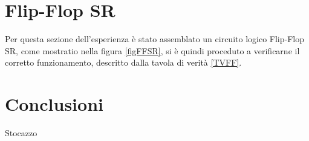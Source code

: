 \documentclass{article}
\begin{document}
    
    
\section{Flip-Flop SR}
    Per questa sezione dell'esperienza è stato assemblato un circuito logico Flip-Flop SR, come mostratio nella figura \ref{figFFSR}, si è quindi proceduto a verificarne il corretto funzionamento, descritto dalla tavola di verità \ref{TVFF}.
    
\section{Conclusioni}
    Stocazzo
 
\end{document}
